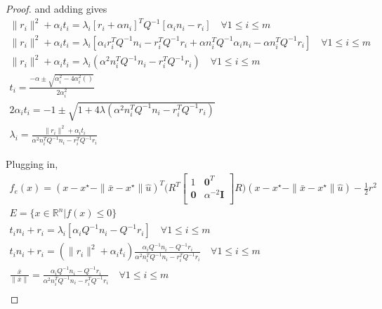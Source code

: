 \begin{proof}
and adding gives
\begin{align*}
\|r_i\|^2  + \alpha_i t_i = \lambda_i\left[r_i + \alpha n_i\right]^TQ^{-1}\left[\alpha_i n_i - r_i\right] \quad \forall 1\le i\le m \\
\|r_i\|^2  + \alpha_i t_i = \lambda_i\left[ \alpha_ir_i^T Q^{-1} n_i - r_i^T Q^{-1}r_i  + \alpha n_i^TQ^{-1}\alpha_i n_i - \alpha n_i^TQ^{-1}r_i   \right] \quad \forall 1\le i\le m \\
\|r_i\|^2  + \alpha_i t_i = \lambda_i\left(\alpha^2 n_i^TQ^{-1} n_i - r_i^T Q^{-1}r_i  \right) \quad \forall 1\le i\le m \\
t_i = \frac{-\alpha \pm \sqrt{\alpha_i^2 - 4\alpha_i^2()}}{2\alpha_i^2} \\
2\alpha_it_i = -1 \pm \sqrt{1 + 4\lambda(\alpha^2 n_i^TQ^{-1} n_i - r_i^T Q^{-1}r_i)} \\
\lambda_i = \frac{\|r_i\|^2  + \alpha_i t_i}{\alpha^2 n_i^TQ^{-1} n_i - r_i^T Q^{-1}r_i}
\end{align*}

Plugging in,
\begin{align*}
f_e(x) = (x - x^{\star} - \|\bar x - x^{\star} \|\hat u)^T\bigg(R^T\begin{bmatrix}
1 & \boldsymbol0^T \\
\boldsymbol 0 & \alpha^{-2} \boldsymbol I \\
\end{bmatrix}R\bigg)(x - x^{\star} - \|\bar x - x^{\star} \|\hat u) - \frac 1 2 r^2 \\
E = \{x \in \mathbb R^n | f(x) \le 0\} \\
t_in_i + r_i = \lambda_i \left[\alpha_i Q^{-1} n_i - Q^{-1}r_i \right] \quad \forall 1\le i\le m \\
t_in_i + r_i = (\|r_i\|^2  + \alpha_i t_i)\frac{\alpha_i Q^{-1} n_i - Q^{-1}r_i}{\alpha^2 n_i^TQ^{-1} n_i - r_i^T Q^{-1}r_i} \quad \forall 1\le i\le m \\
\frac{\bar x}{\|\bar x\|} = \frac{\alpha_i Q^{-1} n_i - Q^{-1}r_i}{\alpha^2 n_i^TQ^{-1} n_i - r_i^T Q^{-1}r_i} \quad \forall 1\le i\le m \\
\end{align*}



\end{proof}
